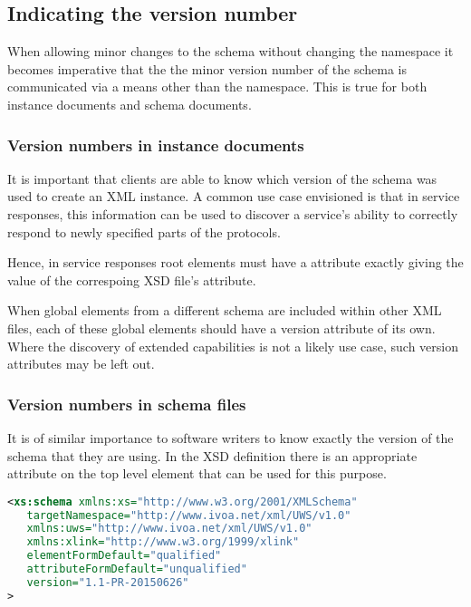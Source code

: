 \documentclass[10pt,a4paper]{ivoa}
\begin{document}
\subsection{Indicating the version number}

When allowing minor changes to the schema without changing the
namespace it becomes imperative that the the minor version number of the schema
is communicated via a means other than the namespace.  This is true for
both instance documents and schema documents.

\subsubsection{Version numbers in instance documents}

It is important that
clients are able to know which version of the schema was used to create an XML
instance.  A common use case envisioned is that in service responses,
this information can be used to discover a service's ability to
correctly respond to newly specified parts of the protocols. 

Hence, in service responses root elements must have
a 
attribute exactly giving the value of the correspoing XSD file's
 attribute.

When global elements from a different schema are included within other
XML files, each of these global elements should have a version attribute
of its own.  Where the discovery of extended capabilities is not a
likely use case, such version attributes may be left out.

\subsubsection{Version numbers in schema files}
It is of similar importance to software writers to know exactly the version of
the schema that they are using. In the XSD definition there is an appropriate
 attribute on the top level  element that can be
used for this purpose.

\begin{lstlisting}[language=XML]
<xs:schema xmlns:xs="http://www.w3.org/2001/XMLSchema"
   targetNamespace="http://www.ivoa.net/xml/UWS/v1.0"
   xmlns:uws="http://www.ivoa.net/xml/UWS/v1.0"
   xmlns:xlink="http://www.w3.org/1999/xlink" 
   elementFormDefault="qualified"
   attributeFormDefault="unqualified"
   version="1.1-PR-20150626"
>
\end{lstlisting}
\end{document}
